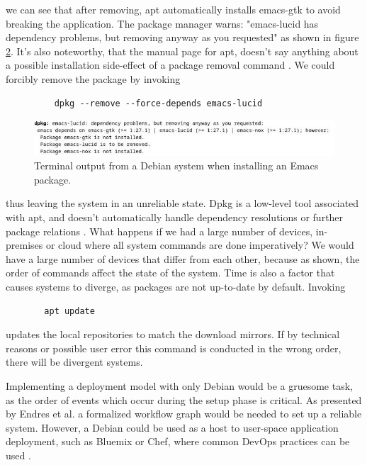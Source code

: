 we can see that after removing, apt automatically installs emacs-gtk
to avoid breaking the application. The package manager warns:
"emacs-lucid has dependency problems, but removing anyway as you
requested" as shown in figure \ref{deb_remove}. It's also noteworthy,
that the manual page for apt, doesn't say anything about a possible
installation side-effect of a package removal command
\cite{ubuntuUbuntuManpage}.  We could forcibly remove the package by
invoking
\begin{figure}[H]\label{dpkgsnippet}
\begin{lstlisting} 
    dpkg --remove --force-depends emacs-lucid
\end{lstlisting}
\end{figure}
\begin{figure}\label{deb_remove}
\includegraphics[scale=2.0]{latex/kuvat/cropped_apt_output.jpg}
\caption{Terminal output from a Debian system when installing an Emacs package.}
\end{figure}
thus leaving the system in an unreliable state. Dpkg is a low-level
tool associated with apt, and doesn't automatically handle dependency
resolutions or further package relations
\cite{thiruvathukal2004gentoo}. What happens if we had a large number
of devices, in-premises or cloud where all system commands are done
imperatively? We would have a large number of devices that differ from
each other, because as shown, the order of commands affect the state
of the system. Time is also a factor that
causes systems to diverge, as packages are not up-to-date by
default. Invoking 
\begin{figure}[H]\label{aptupdate}
\begin{lstlisting} 
  apt update
\end{lstlisting}
\end{figure}
updates the local repositories to match the download mirrors. If by
technical reasons or possible user error this command is conducted in
the wrong order, there will be divergent systems.

Implementing a deployment model with only Debian would be a gruesome
task, as the order of events which occur during the setup phase is
critical. As presented by Endres et al. a formalized workflow graph
would be needed to set up a reliable system. However, a Debian could
be used as a host to user-space application deployment, such as
Bluemix or Chef, where common DevOps practices can be used
\cite{endres2017declarative}.


